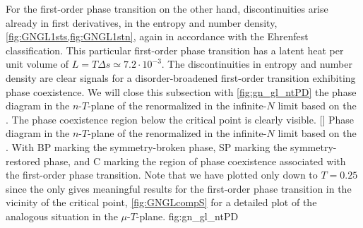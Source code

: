For the first-order phase transition on the other hand, discontinuities arise already in first derivatives, \viz{} in the entropy and number density, \cf{} \cref{fig:GNGL1sts,fig:GNGL1stn}, again in accordance with the Ehrenfest classification.
This particular first-order phase transition has a latent heat per unit volume of $L=T\Delta s\simeq 7.2\cdot 10^{-3}$.
The discontinuities in entropy and number density are clear signals for a disorder-broadened first-order transition exhibiting phase coexistence. 
We will close this subsection with \cref{fig:gn_gl_ntPD} \dash{} the phase diagram in the $n$-$T$-plane of the renormalized \gnm{} in the infinite-$N$ limit based on the \gle{}.
The phase coexistence region below the critical point is clearly visible. 
	[]%
	{%
		Phase diagram in the $n$-$T$-plane of the renormalized \gnm{} in the infinite-$N$ limit based on the \gle{}.
		With BP marking the symmetry-broken phase, SP marking the symmetry-restored phase, and C marking the region of phase coexistence associated with the first-order phase transition.
		Note that we have plotted only down to $T=0.25$ since the \gle{} only gives meaningful results for the first-order phase transition in the vicinity of the critical point, \cf{} \cref{fig:GNGLcompS} for a detailed plot of the analogous situation in the $\mu$-$T$-plane.
	}%
	{fig:gn_gl_ntPD}%